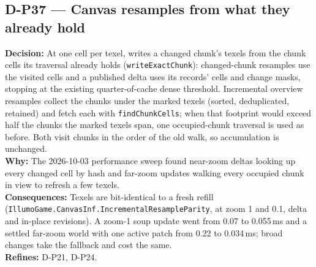 \subsection*{D-P37 --- Canvas resamples from what they already hold}
\begin{decisionbox}[title={D-P37 \quad 2026-10-03}]
\textbf{Decision:} At one cell per texel,  writes a
changed chunk's texels from the chunk cells its traversal already holds
(\texttt{writeExactChunk}): changed-chunk resamples use the visited cells and a
published delta uses its records' cells and change masks, stopping at the
existing quarter-of-cache dense threshold. Incremental overview resamples
collect the chunks under the marked texels (sorted, deduplicated, retained)
and fetch each with \texttt{findChunkCells}; when that footprint would exceed
half the chunks the marked texels span, one occupied-chunk traversal is used
as before. Both visit chunks in the order of the old walk, so accumulation is
unchanged.\\
\textbf{Why:} The 2026-10-03 performance sweep found near-zoom deltas looking
up every changed cell by hash and far-zoom updates walking every occupied
chunk in view to refresh a few texels.\\
\textbf{Consequences:} Texels are bit-identical to a fresh refill
(\texttt{IllumoGame.CanvasInf.IncrementalResampleParity}, at zoom 1 and 0.1,
delta and in-place revisions). A zoom-1 soup update went from 0.07 to
0.055\,ms and a settled far-zoom world with one active patch from 0.22 to
0.034\,ms; broad changes take the fallback and cost the same.\\
\textbf{Refines:} D-P21, D-P24.
\end{decisionbox}

